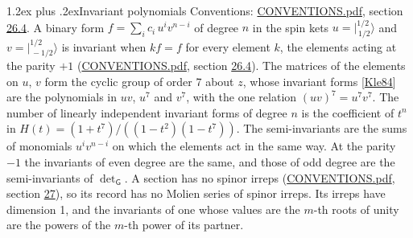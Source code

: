 \documentclass[10pt,a4paper]{article}
\makeatletter
\renewcommand\section{\@startsection{section}{1}{\z@}{-3ex plus -1ex minus -.2ex}%
  {1.2ex plus .2ex}{\normalfont\large\sffamily\bfseries\color{parttitle}}}
\numberwithin{equation}{section}
\newcommand{\grp}[1]{\mathsf{#1}}
\newcommand{\jm}[2]{\bigl\lvert{}^{#1}_{\,#2}\bigr\rangle}
\makeatother
\begin{document}
\section{Invariant polynomials}\label{s:invariants}
Conventions: \href{../../CONVENTIONS.pdf}{CONVENTIONS.pdf}, section \href{../../CONVENTIONS.pdf\#conv.26.4}{26.4}.
\leavevmode\label{n:local.spinor.uv}\label{n:local.binary.form}A binary form $f = \sum_i c_i\, u^i v^{n-i}$ of degree $n$ in the spin kets $u = \jm{1/2}{1/2}$ and $v = \jm{1/2}{-1/2}$ is invariant when $k f = f$ for every element $k$, the elements acting at the parity $+1$ (\href{../../CONVENTIONS.pdf}{CONVENTIONS.pdf}, section \href{../../CONVENTIONS.pdf\#conv.26.4}{26.4}).
The matrices of the elements on $u$, $v$ form the cyclic group of order 7 about $z$, whose invariant forms [\href{../../../REFERENCES.pdf\#ref.Kle84}{Kle84}] are the polynomials in $uv$, $u^{7}$ and $v^{7}$, with the one relation $(uv)^{7} = u^{7}v^{7}$. \label{n:function.hilbert}The number of linearly independent invariant forms of degree $n$ is the coefficient of $t^n$ in $H(t) = (1 + t^{7})/((1-t^{2})(1-t^{7}))$. The semi-invariants are the sums of monomials $u^i v^{n-i}$ on which the elements act in the same way. At the parity $-1$ the invariants of even degree are the same, and those of odd degree are the semi-invariants of $\det_{\grp{G}}$. A section has no spinor irreps (\href{../../CONVENTIONS.pdf}{CONVENTIONS.pdf}, section \href{../../CONVENTIONS.pdf\#conv.27}{27}), so its record has no Molien series of spinor irreps. Its irreps have dimension 1, and the invariants of one whose values are the $m$-th roots of unity are the powers of the $m$-th power of its partner.
\end{document}
